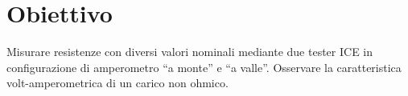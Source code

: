 \section{Obiettivo}


Misurare resistenze con diversi valori nominali mediante due tester ICE in configurazione di amperometro ``a monte'' e ``a valle''. Osservare la caratteristica volt-amperometrica di un carico non ohmico.
